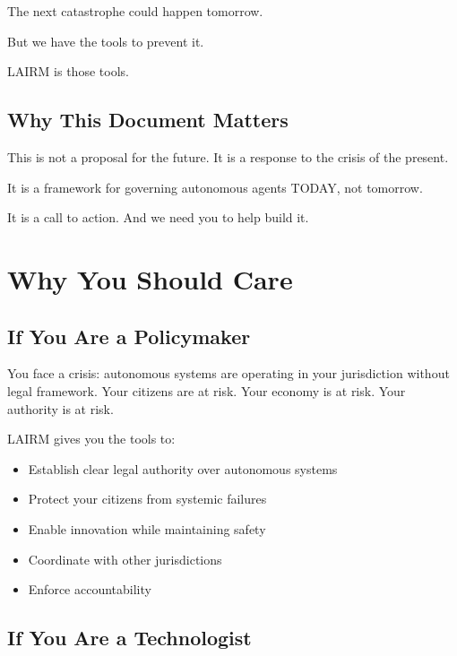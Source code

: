 \documentclass[12pt,a4paper,twoside,openright]{book}
\begin{document}
The next catastrophe could happen tomorrow.

But we have the tools to prevent it.

LAIRM is those tools.

\section*{Why This Document Matters}

This is not a proposal for the future. It is a response to the crisis of the present.

It is a framework for governing autonomous agents TODAY, not tomorrow.

It is a call to action. And we need you to help build it.

\cleardoublepage

\chapter*{Why You Should Care}

\section*{If You Are a Policymaker}

You face a crisis: autonomous systems are operating in your jurisdiction without legal framework. Your citizens are at risk. Your economy is at risk. Your authority is at risk.

LAIRM gives you the tools to:
\begin{itemize}
    \item Establish clear legal authority over autonomous systems
    \item Protect your citizens from systemic failures
    \item Enable innovation while maintaining safety
    \item Coordinate with other jurisdictions
    \item Enforce accountability
\end{itemize}

\section*{If You Are a Technologist}
\end{document}

